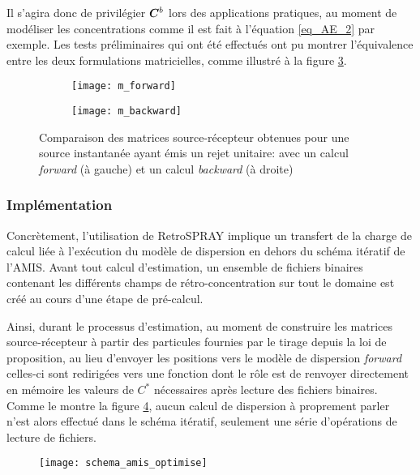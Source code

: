 Il s'agira donc de privilégier ${\bm{C}}^b$ lors des applications pratiques, au moment de modéliser les concentrations comme il est fait  à l'équation \eqref{eq_AE_2} par exemple. Les tests préliminaires qui ont été effectués ont pu montrer l'équivalence entre les deux formulations matricielles, comme illustré à la figure \ref{fig_comparaison_matrices}.

\begin{figure}[h!]
	\centering
	\begin{subfigure}[t]{0.5\textwidth}
		\centering
		\texttt{[image: m\_forward]}
		\caption{}
		\label{forward}
	\end{subfigure}%
	\begin{subfigure}[t]{0.5\textwidth}
		\centering
		\texttt{[image: m\_backward]}
		\caption{}
		\label{backward}
	\end{subfigure}
	\caption{Comparaison des matrices source-récepteur obtenues pour une source instantanée ayant émis un rejet unitaire: avec un calcul \textit{forward} (à gauche) et un calcul \textit{backward} (à droite)}
	\label{fig_comparaison_matrices}	
\end{figure}

\subsubsection{Implémentation}

Concrètement, l'utilisation de RetroSPRAY implique un transfert de la charge de calcul liée à l'exécution du modèle de dispersion en dehors du schéma itératif de l'AMIS. Avant tout calcul d'estimation, un ensemble de fichiers binaires contenant les différents champs de rétro-concentration sur tout le domaine est créé au cours d'une étape de pré-calcul. 

Ainsi, durant le processus d'estimation, au moment de construire les matrices source-récepteur à partir des particules fournies par le tirage depuis la loi de proposition, au lieu d'envoyer les positions vers le modèle de dispersion \textit{forward} celles-ci sont redirigées vers une fonction dont le rôle est de renvoyer directement en mémoire les valeurs de $C^*$ nécessaires après lecture des fichiers binaires. Comme le montre la figure \ref{fig_schema_amis_optimise}, aucun calcul de dispersion à proprement parler n'est alors effectué dans le schéma itératif, seulement une série d'opérations de lecture de fichiers.\\

\begin{figure}[h!]
	\centering
	\texttt{[image: schema\_amis\_optimise]}
	\label{fig_schema_amis_optimise}
	\end{figure}
	
